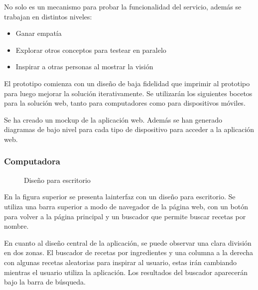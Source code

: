 \begin{enumerate}
No solo es un mecanismo para probar la funcionalidad del servicio, además se trabajan en distintos niveles: 
\begin{itemize}
    \item Ganar empatía
    \item Explorar otros conceptos para testear en paralelo
    \item Inspirar a otras personas al mostrar la visión
\end{itemize}

El prototipo comienza con un diseño de baja fidelidad que imprimir al prototipo para luego mejorar la solución iterativamente. Se utilizarán los siguientes bocetos para la solución web, tanto para computadores como para dispositivos móviles.

Se ha creado un \gls{mockup} de la aplicación web. Además se han generado diagramas de bajo nivel para cada tipo de dispositivo para acceder a la aplicación web.

\subsubsection{Computadora}
\begin{figure}[h!]
\centering
{}
\caption{Diseño para escritorio}
\label{fig:escritorio}
\end{figure}
En la figura superior se presenta la\gls{interfaz} con un diseño para escritorio. Se utiliza una barra superior a modo de navegador de la página web, con un botón para volver a la página principal y un buscador que permite buscar recetas por nombre. 

En cuanto al diseño central de la aplicación, se puede observar una clara división en dos zonas. El buscador de recetas por ingredientes y una columna a la derecha con algunas recetas aleatorias para inspirar al usuario, estas irán cambiando mientras el usuario utiliza la aplicación. Los resultados del buscador aparecerán bajo la barra de búsqueda.


\end{enumerate}
